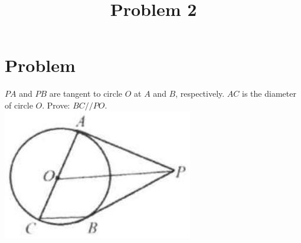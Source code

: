 \documentclass{article}
\title{Problem 2}
\date{}
\begin{document}
\maketitle

\section*{Problem}
\(P A\) and \(P B\) are tangent to circle \(O\) at \(A\) and \(B\), respectively. \(A C\) is the diameter of circle \(O\). Prove: \(B C / / P O\).\\
\centering
\includegraphics[width=\textwidth]{images/problem_image_1.jpg}
\end{document}

